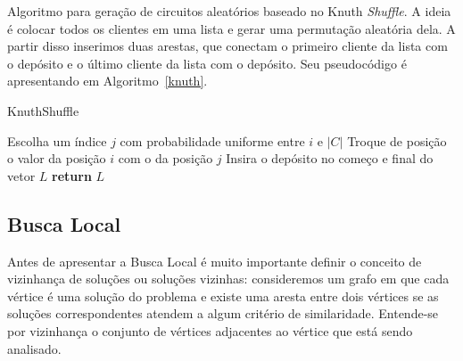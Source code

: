 \documentclass[12pt, a4paper]{article}
\begin{document}
Algoritmo para geração de circuitos aleatórios baseado no Knuth \textit{Shuffle}\cite{knuth2014art}. A ideia é colocar todos os clientes em uma lista e gerar uma permutação aleatória dela. A partir disso inserimos duas arestas, que conectam o primeiro cliente da lista com o depósito e o último cliente da lista com o depósito. Seu pseudocódigo é apresentando em Algoritmo~\ref{knuth}. 
%
\begin{algorithm}[htb!]
  \caption{KnuthShuffle}\label{knuth}
  \begin{algorithmic}[1]
        \State Escolha um índice $j$ com probabilidade uniforme entre $i$ e $|C|$
        \State Troque de posição o valor da posição $i$ com o da posição $j$
      \EndFor
      \State Insira o depósito no começo e final do vetor $L$
      \State \textbf{return} $L$
    \EndFunction
  \end{algorithmic}
\end{algorithm}


\subsection{Busca Local}

Antes de apresentar a Busca Local é muito importante definir o conceito de vizinhança de soluções ou soluções vizinhas: consideremos um grafo em que cada vértice é uma solução do problema e existe uma aresta entre dois vértices se as soluções correspondentes atendem a algum critério de similaridade. Entende-se por vizinhança o conjunto de vértices adjacentes ao vértice que está sendo analisado.
\end{document}
